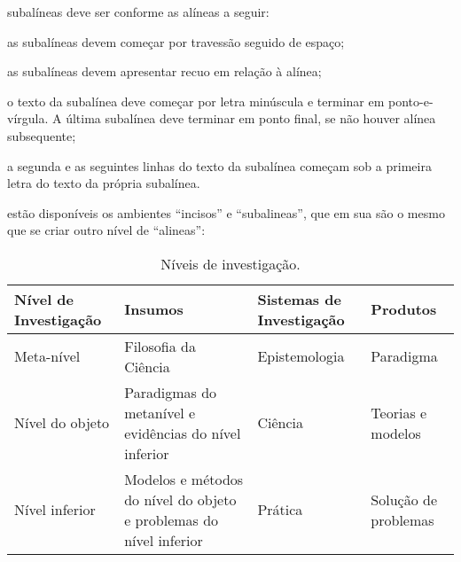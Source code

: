 \documentclass[12pt,openright,twoside,a4paper]{abntex2}
\begin{document}
\begin{alineas}
  \item subalíneas \cite[4.3]{NBR6024:2012} deve ser conforme as alíneas a seguir:

  \begin{alineas}
     \item as subalíneas devem começar por travessão seguido de espaço;

     \item as subalíneas devem apresentar recuo em relação à alínea;

     \item o texto da subalínea deve começar por letra minúscula e terminar em
     ponto-e-vírgula. A última subalínea deve terminar em ponto final, se não
     houver alínea subsequente;

     \item a segunda e as seguintes linhas do texto da subalínea começam sob a
     primeira letra do texto da própria subalínea.
  \end{alineas}
  
  \item estão disponíveis os ambientes ``incisos'' e ``subalineas'', que em sua
  são o mesmo que se criar outro nível de ``alineas'':
  
  \begin{incisos}
    \item \lipsum[52]
  \end{incisos}
  
  \item \lipsum[60]
  
  \begin{subalineas}
    \item \lipsum[53]
  \end{subalineas}
  
  \item \lipsum[54]
  
\end{alineas}

\lipsum[4]

\begin{table}[htb]
\footnotesize
\caption[Níveis de investigação]{\footnotesize{Níveis de investigação.
\cite{van86}}}
\label{tab-nivinv}
\begin{tabular}{p{2.6cm}|p{6.0cm}|p{2.25cm}|p{3.40cm}}
   \textbf{Nível de Investigação} & \textbf{Insumos}  & \textbf{Sistemas de Investigação}  & \textbf{Produtos}  \\
    \hline
    Meta-nível & Filosofia\index{Filosofia} da Ciência  & Epistemologia &
    Paradigma  \\
    \hline
    Nível do objeto & Paradigmas do metanível e evidências do nível inferior &
    Ciência  & Teorias e modelos \\
    \hline
    Nível inferior & Modelos e métodos do nível do objeto e problemas do nível inferior & Prática & Solução de problemas  \\
\end{tabular}
\end{table}
\end{document}
